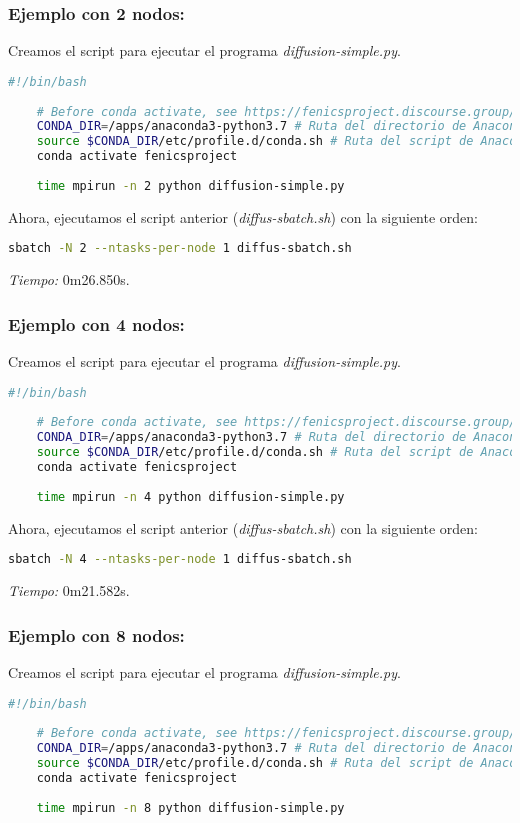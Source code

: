 \subsubsection*{Ejemplo con 2 nodos:}
Creamos el script para ejecutar el programa \textit{diffusion-simple.py}.
\begin{lstlisting}[language=sh]
	#!/bin/bash
	
	# Before conda activate, see https://fenicsproject.discourse.group/t/fenics-from-conda-doesnt-import/3502/6
	CONDA_DIR=/apps/anaconda3-python3.7 # Ruta del directorio de Anaconda
	source $CONDA_DIR/etc/profile.d/conda.sh # Ruta del script de Anaconda
	conda activate fenicsproject
	
	time mpirun -n 2 python diffusion-simple.py
\end{lstlisting}

Ahora, ejecutamos el script anterior (\textit{diffus-sbatch.sh}) con la siguiente orden:
\begin{lstlisting}[language=sh]
	sbatch -N 2 --ntasks-per-node 1 diffus-sbatch.sh
\end{lstlisting}

\textit{Tiempo:} 0m26.850s.

\subsubsection*{Ejemplo con 4 nodos:}
Creamos el script para ejecutar el programa \textit{diffusion-simple.py}.
\begin{lstlisting}[language=sh]
	#!/bin/bash
	
	# Before conda activate, see https://fenicsproject.discourse.group/t/fenics-from-conda-doesnt-import/3502/6
	CONDA_DIR=/apps/anaconda3-python3.7 # Ruta del directorio de Anaconda
	source $CONDA_DIR/etc/profile.d/conda.sh # Ruta del script de Anaconda
	conda activate fenicsproject
	
	time mpirun -n 4 python diffusion-simple.py
\end{lstlisting}

Ahora, ejecutamos el script anterior (\textit{diffus-sbatch.sh}) con la siguiente orden:
\begin{lstlisting}[language=sh]
	sbatch -N 4 --ntasks-per-node 1 diffus-sbatch.sh
\end{lstlisting}

\textit{Tiempo:} 0m21.582s.

\subsubsection*{Ejemplo con 8 nodos:}
Creamos el script para ejecutar el programa \textit{diffusion-simple.py}.
\begin{lstlisting}[language=sh]
	#!/bin/bash
	
	# Before conda activate, see https://fenicsproject.discourse.group/t/fenics-from-conda-doesnt-import/3502/6
	CONDA_DIR=/apps/anaconda3-python3.7 # Ruta del directorio de Anaconda
	source $CONDA_DIR/etc/profile.d/conda.sh # Ruta del script de Anaconda
	conda activate fenicsproject
	
	time mpirun -n 8 python diffusion-simple.py
\end{lstlisting}

